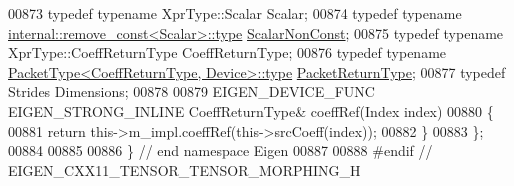 \begin{DoxyCode}
00873   \textcolor{keyword}{typedef} \textcolor{keyword}{typename} XprType::Scalar Scalar;
00874   \textcolor{keyword}{typedef} \textcolor{keyword}{typename} \hyperlink{group___sparse_core___module}{internal::remove\_const<Scalar>::type} 
      \hyperlink{group___sparse_core___module}{ScalarNonConst};
00875   \textcolor{keyword}{typedef} \textcolor{keyword}{typename} XprType::CoeffReturnType CoeffReturnType;
00876   \textcolor{keyword}{typedef} \textcolor{keyword}{typename} \hyperlink{group___sparse_core___module}{PacketType<CoeffReturnType, Device>::type} 
      \hyperlink{group___sparse_core___module}{PacketReturnType};
00877   \textcolor{keyword}{typedef} Strides Dimensions;
00878 
00879   EIGEN\_DEVICE\_FUNC EIGEN\_STRONG\_INLINE CoeffReturnType& coeffRef(Index index)
00880   \{
00881     \textcolor{keywordflow}{return} this->m\_impl.coeffRef(this->srcCoeff(index));
00882   \}
00883 \};
00884 
00885 
00886 \} \textcolor{comment}{// end namespace Eigen}
00887 
00888 \textcolor{preprocessor}{#endif // EIGEN\_CXX11\_TENSOR\_TENSOR\_MORPHING\_H}
\end{DoxyCode}
